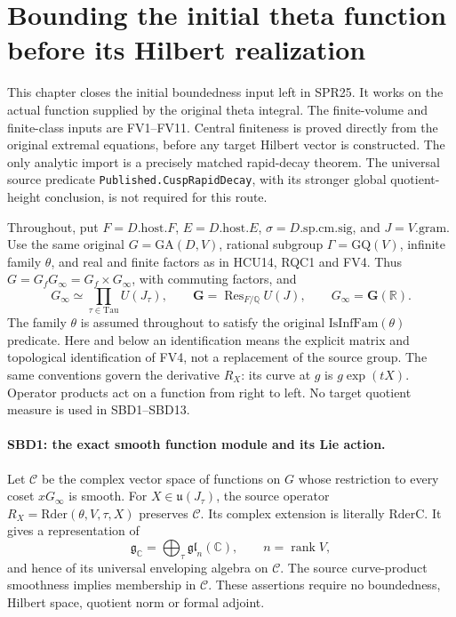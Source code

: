 \documentclass[11pt,a4paper]{article}
\numberwithin{equation}{section}
\theoremstyle{remark}\newtheorem{remark}[theorem]{Remark}
\begin{document}
\section{Bounding the initial theta function before its Hilbert realization}
\label{sec:seed-boundedness}

This chapter closes the initial boundedness input left in SPR25.  It
works on the actual function supplied by the original theta integral.
The finite-volume and finite-class inputs are FV1--FV11.  Central
finiteness is proved directly from the original extremal equations,
before any target Hilbert vector is constructed.  The only analytic
import is a precisely matched rapid-decay theorem.  The universal
source predicate \texttt{Published.\allowbreak Cusp\allowbreak Rapid\allowbreak Decay}, with its stronger
global quotient-height conclusion, is not required for this route.

Throughout, put \(F=D.\mathrm{host}.F\),
\(E=D.\mathrm{host}.E\), \(\sigma=D.\mathrm{sp.cm.sig}\),
and \(J=V.\mathrm{gram}\).  Use the same original
\(G=\mathrm{GA}(D,V)\), rational subgroup \(\Gamma=\mathrm{GQ}(V)\),
infinite family \(\theta\), and real and finite factors as in HCU14,
RQC1 and FV4.  Thus \(G=G_fG_\infty=G_f\times G_\infty\), with
commuting factors, and
\[
 G_\infty\simeq\prod_{\tau\in\mathrm{Tau}}U(J_\tau),\qquad
 \mathbf G=\operatorname{Res}_{F/\mathbb Q}U(J),\qquad
 G_\infty=\mathbf G(\mathbb R).
 \tag{SBD.1}
\]
The family \(\theta\) is assumed throughout to satisfy the original
\(\mathrm{IsInfFam}(\theta)\) predicate.
Here and below an identification means the explicit matrix and
topological identification of FV4, not a replacement of the source
group.  The same conventions govern the derivative \(R_X\): its
curve at \(g\) is \(g\exp(tX)\).  Operator products act on a function
from right to left.  No target quotient measure is used in SBD1--SBD13.

\paragraph{SBD1: the exact smooth function module and its Lie action.}
\label{claim:SBD1}
Let \(\mathcal C\) be the complex vector space of functions on \(G\)
whose restriction to every coset \(xG_\infty\) is smooth.  For
\(X\in\mathfrak u(J_\tau)\), the source operator
\(R_X=\mathrm{Rder}(\theta,V,\tau,X)\) preserves \(\mathcal C\).
Its complex extension is literally \(\mathrm{RderC}\).  It gives a
representation of
\[
 \mathfrak g_{\mathbb C}
   =\bigoplus_\tau\mathfrak{gl}_{n}(\mathbb C),
 \qquad n=\operatorname{rank}V,
\]
and hence of its universal enveloping algebra on \(\mathcal C\).
The source curve-product smoothness implies membership in
\(\mathcal C\).  These assertions require no boundedness, Hilbert
space, quotient norm or formal adjoint.
\end{document}

